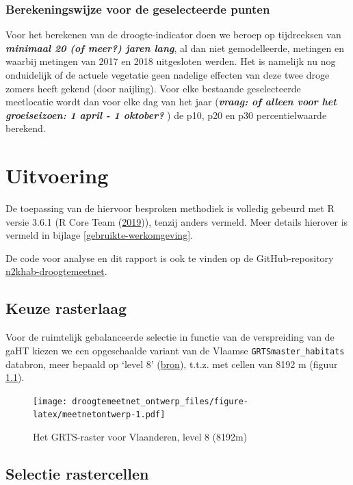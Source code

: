 \documentclass[11pt,]{book}
\begin{document}
\subsection{Berekeningswijze voor de geselecteerde
punten}\label{berekeningswijze-voor-de-geselecteerde-punten}

Voor het berekenen van de droogte-indicator doen we beroep op
tijdreeksen van \textbf{\emph{minimaal 20 (of meer?) jaren lang}}, al
dan niet gemodelleerde, metingen en waarbij metingen van 2017 en 2018
uitgesloten werden. Het is namelijk nu nog onduidelijk of de actuele
vegetatie geen nadelige effecten van deze twee droge zomers heeft gekend
(door naijling). Voor elke bestaande geselecteerde meetlocatie wordt dan
voor elke dag van het jaar (\textbf{\emph{vraag: of alleen voor het
groeiseizoen: 1 april - 1 oktober? }}) de p10, p20 en p30
percentielwaarde berekend.

\chapter{Uitvoering}\label{uitvoering}

De toepassing van de hiervoor besproken methodiek is volledig gebeurd
met R versie 3.6.1 (R Core Team
(\protect\hyperlink{ref-citingR}{2019})), tenzij anders vermeld. Meer
details hierover is vermeld in bijlage \ref{gebruikte-werkomgeving}.

De code voor analyse en dit rapport is ook te vinden op de
GitHub-repository
\href{https://github.com/inbo/n2khab-droogtemeetnet}{n2khab-droogtemeetnet}.

\section{Keuze rasterlaag}\label{keuze-rasterlaag}

Voor de ruimtelijk gebalanceerde selectie in functie van de verspreiding
van de gaHT kiezen we een opgeschaalde variant van de Vlaamse
\texttt{GRTSmaster\_habitats} databron, meer bepaald op `level 8'
(\href{https://doi.org/10.5281/zenodo.3354405}{bron}), t.t.z. met cellen
van 8192 m (figuur \ref{fig:meetnetontwerp}).

\begin{figure}
\centering
\texttt{[image: droogtemeetnet\_ontwerp\_files/figure-latex/meetnetontwerp-1.pdf]}
\caption{\label{fig:meetnetontwerp}Het GRTS-raster voor Vlaanderen, level 8
(8192m)}
\end{figure}

\section{Selectie rastercellen}\label{selectie-rastercellen}
\end{document}
